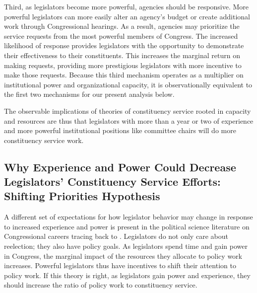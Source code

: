 \documentclass[12pt]{article}
\begin{document}

Third, as legislators become more powerful, agencies should be responsive. More powerful legislators can more easily alter an agency's budget or create additional work through Congressional hearings. As a result, agencies may prioritize the service requests from the most powerful members of Congress. %
The increased likelihood of response provides legislators with the opportunity to demonstrate their effectiveness to their constituents. This increases the marginal return on making requests, providing more prestigious legislators with more incentive to make those requests.  %
Because this third mechanism operates as a multiplier on institutional power and organizational capacity, it is observationally equivalent to the first two mechanisms for our present analysis below.

The observable implications of theories of constituency service rooted in capacity and resources are thus that legislators with more than a year or two of experience and more powerful institutional positions like committee chairs will do more constituency service work.

\subsection{Why Experience and Power Could Decrease Legislators' Constituency Service Efforts: Shifting Priorities Hypothesis}

A different set of expectations for how legislator behavior may change in response to increased experience and power is present in the political science literature on Congressional careers tracing back to \citet{Fenno1973}. Legislators do not only care about reelection; they also have policy goals. As legislators spend time and gain power in Congress, the marginal impact of the resources they allocate to policy work increases. Powerful legislators thus have incentives to shift their attention to policy work. If this theory is right, as legislators gain power and experience, they should increase the ratio of policy work to constituency service.
\end{document}
